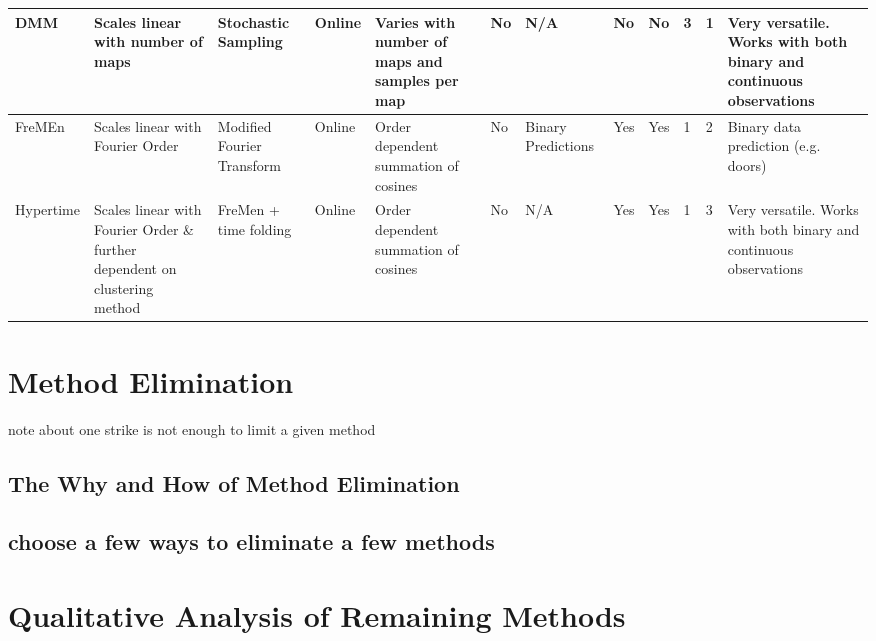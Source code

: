 \begin{table}[]
{\begin{tabular}{|p{3cm}|p{4cm}|p{3cm}|p{2cm}|p{3cm}|p{3cm}|p{3cm}|p{2cm}|p{2cm}|p{4cm}|p{4cm}|p{3cm}|}
  DMM       & Scales linear with number of maps                                          & Stochastic Sampling         & Online            & Varies with number of maps and samples per map & No            & N/A                    & No                     & No                    & 3                 & 1                         & Very versatile. Works with both binary and continuous observations \\ \hline
  FreMEn    & Scales linear with Fourier Order                                           & Modified Fourier Transform  & Online            & Order dependent summation of cosines           & No            & Binary Predictions     & Yes                    & Yes                   & 1                 & 2                         & Binary data prediction (e.g. doors)                                \\ \hline
  Hypertime & Scales linear with Fourier Order \& further dependent on clustering method & FreMen + time folding       & Online            & Order dependent summation of cosines           & No            & N/A                    & Yes                    & Yes                   & 1                 & 3                         & Very versatile. Works with both binary and continuous observations \\ \hline
  \end{tabular}%
  }
  \end{table}

  \section{ Method Elimination }

  note about one strike is not enough to limit a given method

  \subsection{ The Why and How of Method Elimination }

  \subsection{ choose a few ways to eliminate a few methods }

  \section{ Qualitative Analysis of Remaining Methods }


